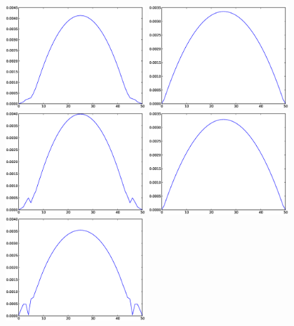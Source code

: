 \documentclass{article}
\begin{document}
\begin{figure}
\includegraphics[width=0.47\textwidth]{Figures/vel_bubble_pressure_width_6.eps}
\hfill
\includegraphics[width=0.47\textwidth]{Figures/vel_bulk_pressure_width_6.eps}\\
\includegraphics[width=0.47\textwidth]{Figures/vel_bubble_pressure_width_10.eps}
\hfill
\includegraphics[width=0.47\textwidth]{Figures/vel_bulk_pressure_width_10.eps}\\
\includegraphics[width=0.47\textwidth]{Figures/vel_bubble_pressure_width_14.eps}

\end{figure}
\end{document}
